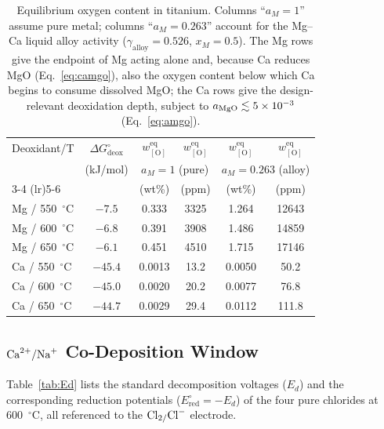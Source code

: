 \documentclass[pdflatex,sn-basic,Numbered]{sn-jnl}
\begin{document}
\begin{table}[!ht]
\centering
\footnotesize
\caption{Equilibrium oxygen content in titanium. Columns ``$a_M=1$'' assume pure metal; columns ``$a_M=0.263$'' account for the Mg--Ca liquid alloy activity ($\gamma_{\mathrm{alloy}}=0.526$, $x_M=0.5$). The Mg rows give the endpoint of Mg acting alone and, because Ca reduces MgO (Eq.~\ref{eq:camgo}), also the oxygen content below which Ca begins to consume dissolved MgO; the Ca rows give the design-relevant deoxidation depth, subject to $a_{\ce{MgO}} \lesssim 5\times10^{-3}$ (Eq.~\ref{eq:amgo}).}
\label{tab:deox}
\begin{tabular}{lccccc}
\toprule
Deoxidant/T & $\Delta G^{\circ}_{\mathrm{deox}}$ & $w_{[\mathrm{O}]}^{\mathrm{eq}}$ & $w_{[\mathrm{O}]}^{\mathrm{eq}}$ & $w_{[\mathrm{O}]}^{\mathrm{eq}}$ & $w_{[\mathrm{O}]}^{\mathrm{eq}}$ \\
 & (kJ/mol) & \multicolumn{2}{c}{$a_M=1$ (pure)} & \multicolumn{2}{c}{$a_M=0.263$ (alloy)} \\
\cmidrule(lr){3-4} \cmidrule(lr){5-6}
 & & (wt\%) & (ppm) & (wt\%) & (ppm) \\
\midrule
Mg / 550~$^{\circ}$C & $-7.5$ & 0.333 & 3325 & 1.264 & 12643 \\
Mg / 600~$^{\circ}$C & $-6.8$ & 0.391 & 3908 & 1.486 & 14859 \\
Mg / 650~$^{\circ}$C & $-6.1$ & 0.451 & 4510 & 1.715 & 17146 \\
Ca / 550~$^{\circ}$C & $-45.4$ & 0.0013 & 13.2 & 0.0050 & 50.2 \\
Ca / 600~$^{\circ}$C & $-45.0$ & 0.0020 & 20.2 & 0.0077 & 76.8 \\
Ca / 650~$^{\circ}$C & $-44.7$ & 0.0029 & 29.4 & 0.0112 & 111.8 \\
\bottomrule
\end{tabular}
\end{table}

\subsection{\texorpdfstring{$\ce{Ca^{2+}/Na+}$}{Ca2+/Na+} Co-Deposition Window}

Table~\ref{tab:Ed} lists the standard decomposition voltages ($E_d$) and the corresponding reduction potentials ($E^{\circ}_{\mathrm{red}} = -E_d$) of the four pure chlorides at 600~$^{\circ}$C, all referenced to the $\ce{Cl2/Cl-}$ electrode.
\end{document}
